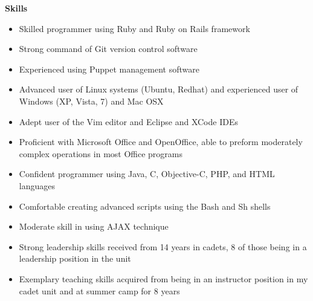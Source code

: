 \documentclass[letterpaper,11pt]{article}
\newcommand{\resheading}[1]{{\large \colorbox{mygrey}{\begin{minipage}{\textwidth}{\textbf{#1 \vphantom{p\^{E}} }}\end{minipage}} }}
\begin{document}
\resheading{{Skills}} %
    \begin{itemize}
        \item Skilled programmer using Ruby and Ruby on Rails framework
        \item Strong command of Git version control software
        \item Experienced using Puppet management software
        \item Advanced user of Linux systems (Ubuntu, Redhat) and experienced user of Windows (XP, Vista, 7) and Mac OSX
        \item Adept user of the Vim editor and Eclipse and XCode IDEs
        \item Proficient with Microsoft Office and OpenOffice, able to preform moderately complex operations in most Office programs
        \item Confident programmer using Java, C, Objective-C, PHP, and HTML languages
        \item Comfortable creating advanced scripts using the Bash and Sh shells
        \item Moderate skill in using AJAX technique
        \item Strong leadership skills received from 14 years in cadets, 8 of those being in a leadership position in the unit
        \item Exemplary teaching skills acquired from being in an instructor position in my cadet unit and at summer camp for 8 years
    \end{itemize}
\end{document}

